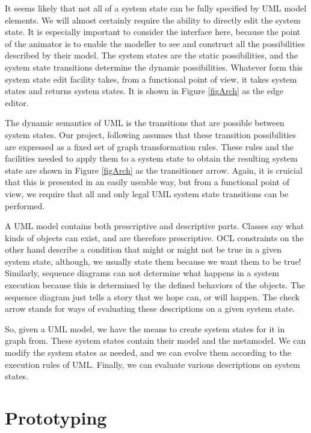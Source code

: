 \documentclass[a4paper]{article}
\begin{document}
It seems likely that not all of a system state can be fully specified
by UML model elements.  We will almost certainly require the ability
to directly edit the system state.  It is especially important to
consider the interface here, because the point of the animator is to
enable the modeller to see and construct all the possibilities
described by their model.  The system states are the static
possibilities, and the system state transitions determine the dynamic
possibilities.  Whatever form this system state edit facility takes,
from a functional point of view, it takes system states and returns
system states.  It is shown in Figure \ref{figArch} as the edge {\sf
  editor}.

The dynamic semantics of UML is the transitions that are possible
between system states.  Our project, following \cite{myThesis} assumes
that these transition possibilities are expressed as a fixed set of
graph transformation rules.  These rules and the facilities needed to
apply them to a system state to obtain the resulting system state are
shown in Figure \ref{figArch} as the {\sf transitioner} arrow.  Again,
it is cruicial that this is presented in an easily useable way, but
from a functional point of view, we require that all and only legal
UML system state transitions can be performed.

A UML model contains both prescriptive and descriptive parts.  Classes
say what kinds of objects can exist, and are therefore prescriptive.
OCL constraints on the other hand describe a condition that might or
might not be true in a given system state, although, we usually state
them because we want them to be true!  Similarly, sequence diagrams
can not determine what happens in a system execution because this is
determined by the defined behaviors of the objects.  The sequence
diagram just tells a story that we hope can, or will happen.  The {\sf
  check} arrow stands for ways of evaluating these descriptions on a
given system state.

So, given a UML model, we have the means to create system states for
it in graph from.  These system states contain their model and the
metamodel.  We can modify the system states as needed, and we can
evolve them according to the execution rules of UML.  Finally, we can
evaluate various descriptions on system states.

\section{Prototyping}
\label{prototyping}
\end{document}
